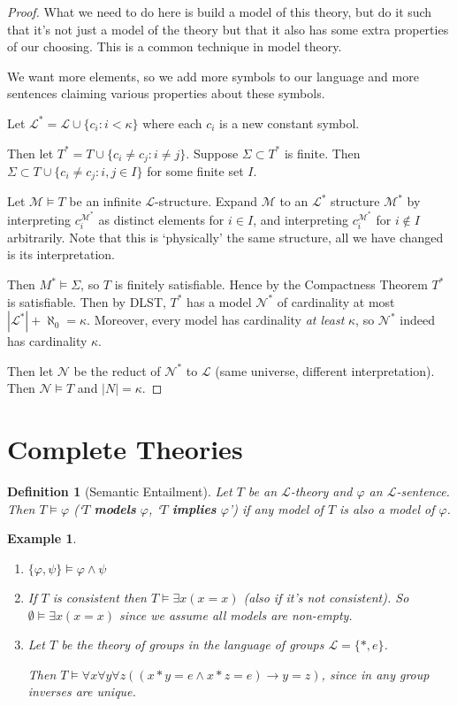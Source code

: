 \documentclass[]{article}
\theoremstyle{custhm}
\theoremstyle{cusdef}
\newtheorem{defin}[theorem]{Definition}
\theoremstyle{custhm}
\theoremstyle{custhm}
\theoremstyle{custhm}
\theoremstyle{ex}
\newtheorem{ex}[theorem]{Example}
\theoremstyle{custhm}
\theoremstyle{cusdef}
\theoremstyle{remark}
\theoremstyle{remark}
\newcommand{\ra}{\rightarrow}
\newcommand{\undf}[1]{\textit{\textbf{#1}}}
\renewcommand{\L}{\mathcal{L}}
\renewcommand{\it}[1]{\textit{#1}}
\newcommand{\M}{\mathcal{M}}
\renewcommand{\phi}{\varphi}
\begin{document}
\begin{proof}
What we need to do here is build a model of this theory, but do it such that it's not just a model of the theory but that it also has some extra properties of our choosing. This is a common technique in model theory.

We want more elements, so we add more symbols to our language and more sentences claiming various properties about these symbols.

Let $\L^\ast = \L \cup \{c_i : i < \kappa\}$ where each $c_i$ is a new constant symbol.

Then let $T^\ast = T\cup \{c_i\ne c_j: i\ne j\}$. Suppose $\Sigma \subset T^\ast$ is finite. Then $\Sigma \subset T\cup\{c_i\ne c_j:i,j\in I\}$ for some finite set $I$.

Let $\M\models T$ be an infinite $\L$-structure. Expand $\M$ to an $\L^{\ast}$ structure $\M^\ast$ by interpreting $c_i^{\M^\ast}$ as distinct elements for $i\in I$, and interpreting $c_i^{\M^\ast}$ for $i\not\in I$ arbitrarily. Note that this is `physically' the same structure, all we have changed is its interpretation.

Then $M^{\ast}\models\Sigma$, so $T$ is finitely satisfiable. Hence by the Compactness Theorem $T^\ast$ is satisfiable. Then by DLST, $T^\ast$ has a model $\mathcal{N}^\ast$ of cardinality at most $|\L^\ast|+\aleph_0 = \kappa$. Moreover, every model has cardinality \it{at least} $\kappa$, so $\mathcal{N}^\ast$ indeed has cardinality $\kappa$.

Then let $\mathcal{N}$ be the reduct of $\mathcal{N}^\ast$ to $\L$ (same universe, different interpretation). Then $\mathcal{N}\models T$ and $|N| = \kappa$.
\end{proof}

\section{Complete Theories}

\begin{defin}[Semantic Entailment]
Let $T$ be an $\L$-theory and $\phi$ an $\L$-sentence. Then $T\models \phi$ (`$T$ \undf{models} $\phi$, `$T$ \undf{implies} $\phi$') if any model of $T$ is also a model of $\phi$.
\end{defin}

\begin{ex}\ 
\begin{enumerate}[label=\arabic*)]
\item $\{\phi,\psi\}\models \phi\land\psi$
\item If $T$ is consistent then $T\models \exists x(x=x)$ (also if it's not consistent). So $\emptyset \models \exists x(x=x)$ since we assume all models are non-empty.
\item Let $T$ be the theory of groups in the language of groups $\L = \{\ast,e\}$.

Then $T\models \forall x\forall y\forall z\left((x\ast y = e\land x\ast z = e)\ra y=z\right)$, since in any group inverses are unique.
\end{enumerate}
\end{ex}
\end{document}
